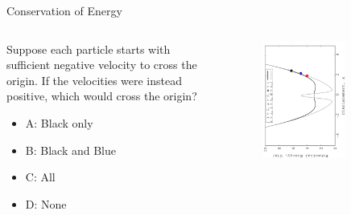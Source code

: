 \documentclass{beamer}
\begin{document}
\begin{frame}{Conservation of Energy}
\begin{columns}[T]
\begin{column}{0.3\textwidth}
\small
Suppose each particle starts with sufficient negative velocity to cross the origin.  If the velocities were instead positive, which would cross the origin?
\begin{itemize}
\item A: Black only
\item B: Black and Blue
\item C: All
\item D: None
\end{itemize}
\end{column}
\begin{column}{0.7\textwidth}
\begin{figure}
\centering
\includegraphics[width=0.7\textwidth,angle=270]{figures/Nov14_plot1.jpg}
\end{figure}
\end{column}
\end{columns}
\end{frame}
\end{document}
